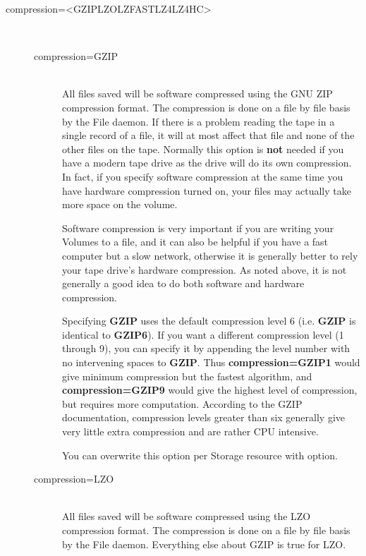 \begin{description}
    \item [compression={\textless}GZIP{\textbar}LZO{\textbar}LZFAST{\textbar}LZ4{\textbar}LZ4HC{\textgreater}] \hfill \\
    \begin{description}


    \item [compression=GZIP] \hfill \\
    All files saved will be software compressed using the GNU ZIP
    compression format.  The compression is done on a file by file basis by
    the File daemon.  If there is a problem reading the tape in a single
    record of a file, it will at most affect that file and none of the other
    files on the tape.  Normally this option is {\bf not} needed if you have
    a modern tape drive as the drive will do its own compression.  In fact,
    if you specify software compression at the same time you have hardware
    compression turned on, your files may actually take more space on the
    volume.

    Software compression is very important if you are writing your Volumes
    to a file, and it can also be helpful if you have a fast computer but a
    slow network, otherwise it is generally better to rely your tape drive's
    hardware compression.  As noted above, it is not generally a good idea
    to do both software and hardware compression.

    Specifying {\bf GZIP} uses the default compression level 6 (i.e.  {\bf
    GZIP} is identical to {\bf GZIP6}).  If you want a different compression
    level (1 through 9), you can specify it by appending the level number
    with no intervening spaces to {\bf GZIP}.  Thus {\bf compression=GZIP1}
    would give minimum compression but the fastest algorithm, and {\bf
    compression=GZIP9} would give the highest level of compression, but
    requires more computation.  According to the GZIP documentation,
    compression levels greater than six generally give very little extra
    compression and are rather CPU intensive.

    You can overwrite this option per Storage resource with
     option.

    \item [compression=LZO] \hfill \\
    All files saved will be software compressed using the LZO
    compression format. The compression is done on a file by file basis by
    the File daemon. Everything else about GZIP is true for LZO.


\end{description}
\end{description}
